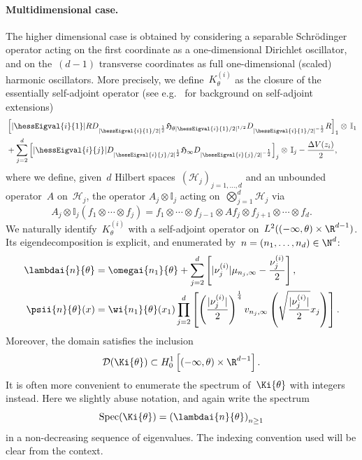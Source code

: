     \paragraph{Multidimensional case.}
    The higher dimensional case is obtained by considering a separable Schr\"odinger operator acting on the first coordinate as a one-dimensional Dirichlet oscillator, and on the~$(d-1)$ transverse coordinates as full one-dimensional (scaled) harmonic oscillators.
    More precisely, we define~$K_{\theta}^{(i)}$ as the closure of the essentially self-adjoint operator (see e.g.~\cite[Chapter X]{RS75} for background on self-adjoint extensions)
    \[\begin{split}
        &\left[|\hessEigval{i}{1}|R D_{|\hessEigval{i}{1}/2|^{\frac12}}\mathfrak{H}_{\theta|\hessEigval{i}{1}/2|^{1/2}}D_{|\hessEigval{i}{1}/2|^{-\frac12}}R\right]_{1} \otimes\,\mathbb{I}_{1}\\
        &+\sum_{j=2}^d \left[|\hessEigval{i}{j}|D_{|\hessEigval{i}{j}/2|^{\frac12}}\mathfrak{H}_{\infty}D_{|\hessEigval{i}{j}/2|^{-\frac12}} \right]_{j}\otimes\,\mathbb{I}_{j} - \frac{\Delta V(z_i)}{2},
    \end{split}\]
    where we define, given~$d$ Hilbert spaces~$(\mathcal H_j)_{j=1,\dots,d}$ and an unbounded operator~$A$ on~$\mathcal H_j$, the operator $A_{j}\otimes\mathbb{I}_{j}$ acting on~$\bigotimes_{j=1}^d \mathcal H_j$ via
    $${A_{j}\otimes\mathbb{I}_{j}(f_1\otimes\dotsm\otimes f_j) = f_1\otimes\dotsm\otimes f_{j-1}\otimes Af_j \otimes f_{j+1}\otimes \dotsm\otimes f_d}.$$
    We naturally identify~$K_{\theta}^{(i)}$ with a self-adjoint operator on~$L^2((-\infty,\theta)\times \R^{d-1})$. Its eigendecomposition is explicit, and enumerated by~$n = (n_1,\dots,n_d)\in\N^d$:
    \begin{equation}
        \label{02:eq:full_harmonic_eigenstates}
        \begin{aligned}
        \lambdai{n}{\theta} &= \omegai{n_1}{\theta} + \sum_{j=2}^{d}\left[|\nu_j^{(i)}|\mu_{n_j,\infty} - \frac{\nu_j^{(i)}}2\right],\\
        \psii{n}{\theta}(x) &= \wi{n_1}{\theta}(x_1)\prod_{j=2}^d \left[\left(\frac{|\nu_j^{(i)}|}{2}\right)^{\frac14}v_{n_j,\infty}\left(\sqrt{\frac{|\nu^{(i)}_j|}2}x_j\right)\right].
        \end{aligned}
    \end{equation}
    Moreover, the domain satisfies the inclusion
    \begin{equation}
        \label{02:eq:full_harmonic_domain}
        \mathcal D(\Ki{\theta}) \subset H_0^1\left[(-\infty,\theta)\times\R^{d-1}\right].
    \end{equation}
    It is often more convenient to enumerate the spectrum of~$\Ki{\theta}$ with integers instead. Here we slightly abuse notation, and again write the spectrum
    \begin{equation}
        \label{02:eq:ki_enumeration}
        \mathrm{Spec}(\Ki{\theta}) = \left(\lambdai{n}{\theta}\right)_{n\geq 1}
    \end{equation}
    in a non-decreasing sequence of eigenvalues. The indexing convention used will be clear from the context.

